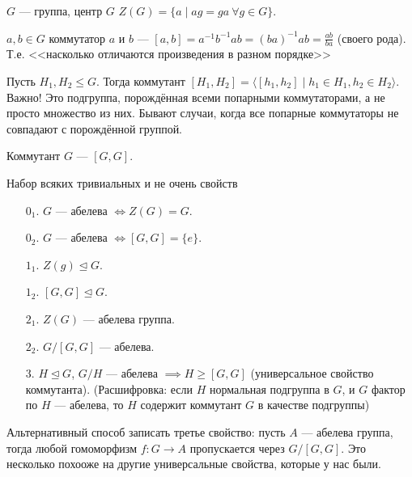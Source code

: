 \begin{definition}
    $G$ --- группа, центр  $G$  $Z(G) = \{ a \mid ag = ga\ \forall g \in G\}$.
\end{definition}
\begin{definition}
	$a, b \in G$ коммутатор  $a$ и  $b$ ---  $[a, b] = a^{-1}b^{-1}ab = (ba)^{-1}ab = \frac{ab}{ba}$ (своего рода). Т.е. <<насколько отличаются произведения в разном порядке>>
\end{definition}
\begin{definition}
    Пусть $H_1, H_2 \le G$. Тогда коммутант $[H_1, H_2] = \langle [h_1, h_2] \mid h_1 \in H_1, h_2 \in H_2\rangle$. Важно! Это подгруппа, порождённая всеми попарными коммутаторами, а не просто множество из них. Бывают случаи, когда все попарные коммутаторы не совпадают с порождённой группой.
\end{definition}
\begin{definition}
    Коммутант $G$ --- $[G, G]$.
\end{definition}
\begin{theorem} 
	Набор всяких тривиальных и не очень свойств  %
    \begin{enumerate}
        \item[$0_1$.] $G$ --- абелева  $\iff Z(G) = G$.
        \item[$0_2$.] $G$ --- абелева $\iff [G, G] = \{e\}$.
        \item[$1_1$.] $Z(g) \trianglelefteq G$.
        \item[$1_2$.] $[G, G] \trianglelefteq G$.
        \item[$2_1$.] $Z(G)$ --- абелева группа.
        \item[$2_2$.] $G / [G, G]$ --- абелева.
        \item[3.]  $H \trianglelefteq G$,  $G / H$ --- абелева  $\implies H \ge [G, G]$ (универсальное свойство коммутанта). (Расшифровка: если $H$ нормальная подгруппа в $G$, и $G$ фактор по $H$ --- абелева, то $H$ содержит коммутант $G$ в качестве подгруппы)
    \end{enumerate}
\end{theorem}
Альтернативный способ записать третье свойство: пусть $A$ --- абелева группа, тогда любой гомоморфизм $f : G \to A$ пропускается через $G / [G, G]$. Это несколько похооже на другие универсальные свойства, которые у нас были.

